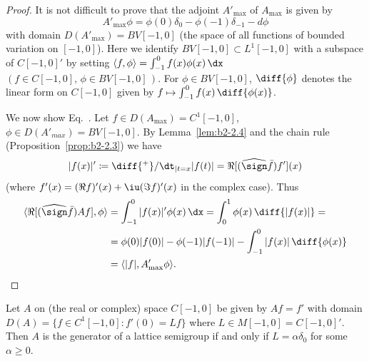 \begin{proof}
It is not difficult to prove that the adjoint $A'_{\max}$ of\/ $A_{\max}$ is given by
\begin{equation}\label{eq:b2-2.17}
A'_{\max}\phi = \phi(0)\delta_{0} - \phi(-1)\delta_{-1} - d\phi
\end{equation}
with domain $D(A'_{\max}) = BV[-1,0]$ (the space of all functions of bounded variation on $[-1,0]$).
Here we identify $BV[-1,0] \subset L^{1}[-1,0]$ with a subspace of\/ $C[-1,0]'$ by setting $\langle f,\phi \rangle = \int_{-1}^{0} f(x)\phi(x)\,\dx$\, $(f \in C[-1,0], \,\phi \in BV[-1,0]\,)$.
For $\phi \in BV[-1,0]$,  $\diff{\phi}$ denotes the linear form on $C[-1,0]$ given by $f \mapsto \int_{-1}^{0} f(x)\, \diff{\phi(x)}$.

We now show Eq.~.
Let $f \in D(A_{\max}) = C^{1}[-1,0]$, $\phi \in D(A'_{max}) =  BV[-1,0]$.
By Lemma~\ref{lem:b2-2.4} and the chain rule (Proposition~\ref{prop:b2-2.3}) we have
\[
|f(x)|' \coloneqq \diff{^{+}}/\dt_{|t=x}|f(t)| = \Re[(\widehat{\sign} \bar{f})f'](x)
\]
(where $f'(x) = (\Re f)'(x) + \iu (\Im f)'(x)$ in the complex case).
Thus
\begin{align*}
\langle \Re[(\widehat{\sign} \bar{f})Af],\phi \rangle &= \int_{-1}^{0} |f(x)|'\phi(x)\, \dx = \int_{0}^{1} \phi(x)\, \diff{|f(x)|} = \\
&= \phi(0)|f(0)| - \phi(-1)|f(-1)| - \int_{-1}^{0} |f(x)|\,\diff{\phi(x)}  \\
&= \langle |f|,A'_{\max}\phi \rangle.
\end{align*}
\end{proof}
\begin{example}\label{ex:b2-2.13}
Let $A$ on (the real or complex) space $C[-1,0]$ be given by $Af = f'$ with domain $D(A) = \{f \in C^{1}[-1,0] \colon f'(0) = Lf\}$ where $L \in M[-1,0] = C[-1,0]'$.
Then $A$ is the generator of a lattice semigroup if and only if\/ $L = \alpha\delta_{0}$ for some $\alpha \geq 0$.
\end{example}
